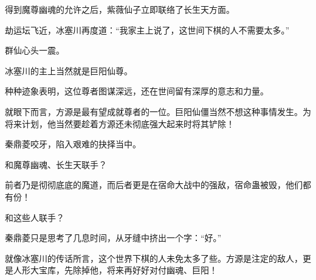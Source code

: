 \begin{this_body}
得到魔尊幽魂的允许之后，紫薇仙子立即联络了长生天方面。

劫运坛飞近，冰塞川再度道：“我家主上说了，这世间下棋的人不需要太多。”

群仙心头一震。

冰塞川的主上当然就是巨阳仙尊。

种种迹象表明，这位尊者图谋深远，还在世间留有深厚的意志和力量。

就眼下而言，方源是最有望成就尊者的一位。巨阳仙僵当然不想这种事情发生。为将来计划，他当然要趁着方源还未彻底强大起来时将其铲除！

秦鼎菱咬牙，陷入艰难的抉择当中。

和魔尊幽魂、长生天联手？

前者乃是彻彻底底的魔道，而后者更是在宿命大战中的强敌，宿命蛊被毁，他们都有份！

和这些人联手？

秦鼎菱只是思考了几息时间，从牙缝中挤出一个字：“好。”

就像冰塞川的传话所言，这个世界下棋的人未免太多了些。方源是注定的敌人，更是人形大宝库，先除掉他，将来再好好对付幽魂、巨阳！

\end{this_body}


